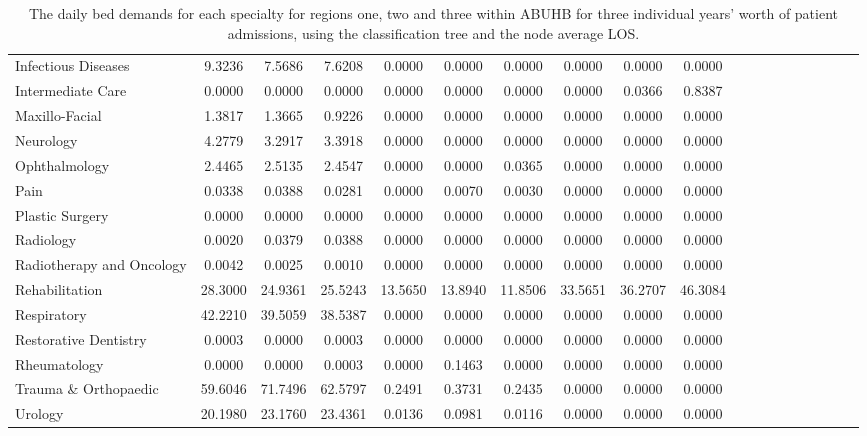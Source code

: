 \documentclass[thesis.tex]{subfiles}
\begin{document}
\begin{landscape}
\begin{table}[h!]
{\begin{tabular}{lcccccccccccccccccc}
Infectious Diseases&	9.3236&	7.5686&	7.6208&	0.0000&	0.0000&	0.0000&	0.0000&	0.0000&	0.0000\\
Intermediate Care&	0.0000&	0.0000&	0.0000&	0.0000&	0.0000&	0.0000&	0.0000&	0.0366&	0.8387\\
Maxillo-Facial&	1.3817&	1.3665&	0.9226&	0.0000&	0.0000&	0.0000&	0.0000&	0.0000&	0.0000\\
Neurology&	4.2779&	3.2917&	3.3918&	0.0000&	0.0000&	0.0000&	0.0000&	0.0000&	0.0000\\
Ophthalmology&	2.4465&	2.5135&	2.4547&	0.0000&	0.0000&	0.0365&	0.0000&	0.0000&	0.0000\\
Pain&	0.0338&	0.0388&	0.0281&	0.0000&	0.0070&	0.0030&	0.0000&	0.0000&	0.0000\\
Plastic Surgery&	0.0000&	0.0000&	0.0000&	0.0000&	0.0000&	0.0000&	0.0000&	0.0000&	0.0000\\
Radiology&	0.0020&	0.0379&	0.0388&	0.0000&	0.0000&	0.0000&	0.0000&	0.0000&	0.0000\\
Radiotherapy and Oncology&	0.0042&	0.0025&	0.0010&	0.0000&	0.0000&	0.0000&	0.0000&	0.0000&	0.0000\\
Rehabilitation&	28.3000&	24.9361&	25.5243&	13.5650&	13.8940&	11.8506&	33.5651&	36.2707&	46.3084\\
Respiratory&	42.2210&	39.5059&	38.5387&	0.0000&	0.0000&	0.0000&	0.0000&	0.0000&	0.0000\\
Restorative Dentistry&	0.0003&	0.0000&	0.0003&	0.0000&	0.0000&	0.0000&	0.0000&	0.0000&	0.0000\\
Rheumatology&	0.0000&	0.0000&	0.0003&	0.0000&	0.1463&	0.0000&	0.0000&	0.0000&	0.0000\\
Trauma \& Orthopaedic&	59.6046&	71.7496&	62.5797&	0.2491&	0.3731&	0.2435&	0.0000&	0.0000&	0.0000\\
Urology&	20.1980&	23.1760&	23.4361&	0.0136&	0.0981&	0.0116&	0.0000&	0.0000&	0.0000\\
\bottomrule

    \end{tabular}  } 
    \caption{The daily bed demands for each specialty for regions one, two and three within ABUHB for three individual years’ worth of patient admissions, using the classification tree and the node average LOS.}
    \label{apptab:LinkedDemands7a}
\end{table}



\end{landscape}
\end{document}
